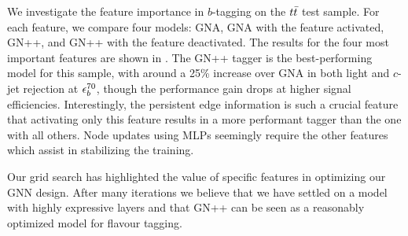 We investigate the feature importance in $b$-tagging on the $t\bar{t}$ test sample.
For each feature, we compare four models: GNA, GNA with the feature activated, GN++, and GN++ with the feature deactivated.
The results for the four most important features are shown in .
The GN++ tagger is the best-performing model for this sample, with around a 25\% increase over GNA in both light and $c$-jet rejection at $\epsilon_b^{70}$, though the performance gain drops at higher signal efficiencies.
Interestingly, the persistent edge information is such a crucial feature that activating only this feature results in a more performant tagger than the one with all others.
Node updates using MLPs seemingly require the other features which assist in stabilizing the training.

Our grid search has highlighted the value of specific features in optimizing our GNN design.
After many iterations we believe that we have settled on a model with highly expressive layers and that GN++ can be seen as a reasonably optimized model for flavour tagging.

